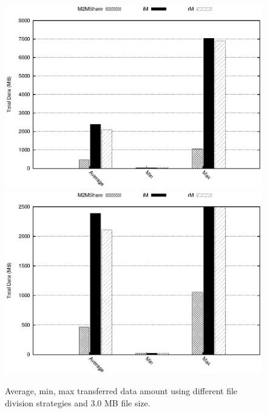 \begin{figure}[htbp]
\centering%
\subfigure%
{\includegraphics[scale=0.7]{grafici/dataDFS_25MB.eps}}\qquad\qquad
\subfigure%
{\includegraphics{grafici/dataDFS_25MB_zoom.eps}}
\caption{Average, min, max transferred data amount using different file division strategies and 3.0 MB file size.\label{graficoDataFDS_25MB}}
\end{figure}

